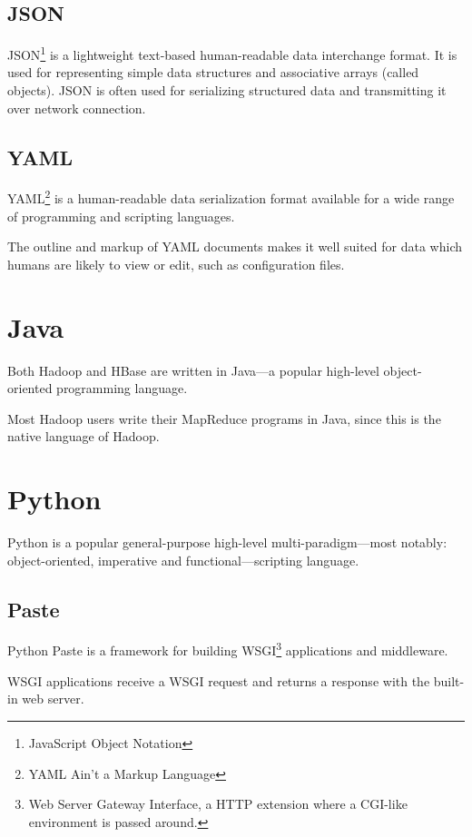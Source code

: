 \documentclass[a4paper,10pt]{book}
\begin{document}
\subsection{JSON}

JSON\footnote{JavaScript Object Notation} is a lightweight text-based
human-readable data interchange format. It is used for representing simple
data structures and associative arrays (called objects). JSON is often used
for serializing structured data and transmitting it over network
connection.


\subsection{YAML}

YAML\footnote{YAML Ain't a Markup Language} is a human-readable data
serialization format available for a wide range of programming and
scripting languages.

The outline and markup of YAML documents makes it well suited for data
which humans are likely to view or edit, such as configuration files.



\section{Java}

Both Hadoop and HBase are written in Java---a popular high-level
object-oriented programming language.

Most Hadoop users write their MapReduce programs in Java, since this is the
native language of Hadoop.



\section{Python}

Python is a popular general-purpose high-level multi-paradigm---most
notably: object-oriented, imperative and functional---scripting language.


\subsection{Paste}

Python Paste is a framework for building WSGI\footnote{Web Server Gateway
Interface, a HTTP extension where a CGI-like environment is passed around.}
applications and middleware.

WSGI applications receive a WSGI request and returns a response with the
built-in web server.
\end{document}
